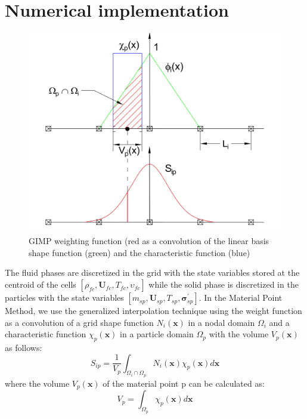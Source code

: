 \documentclass[preprint,12pt]{elsarticle}
\begin{document}
\section{\textsf{Numerical implementation}}
\label{Discretization}
%
%
\begin{figure}[H]
\center
\includegraphics[scale=.5]{GIMPshape.jpg}
\caption{GIMP weighting function (red as a convolution of the linear basis shape function (green) and the characteristic function (blue)}
\label{fig:GIMP}
\end {figure}
%
The fluid phases are discretized in the grid with the state variables stored at the centroid of the cells $[\rho_{fc},\pmb{U}_{fc},T_{fc},\upsilon_{fc}]$ while the solid phase is discretized in the particles with the state variables $[m_{sp},\pmb{U}_{sp},T_{sp},\pmb{\sigma}^\prime_{sp}]$. In the Material Point Method, we use the generalized interpolation technique \cite{GIMP} using the weight function as a convolution of a grid shape function $N_i(\pmb{x})$ in a nodal domain $\Omega_i$ and a characteristic function $\chi_p (\pmb{x})$ in a particle domain $\Omega_p$ with the volume $V_p (\pmb{x})$ as follows:
%
%
\begin{equation}
     S_{ip} = \frac {1}{V_p} \int_{\Omega_i \cap \Omega_p} N_i(\pmb{x}) \chi_p (\pmb{x}) d\pmb{x}
\end {equation}
%
%
where the volume $V_p (\pmb{x})$ of the material point p can be calculated as:
%
%
\begin{equation}
     V_{p} = \int_{\Omega_p} \chi_p (\pmb{x}) d\pmb{x}
\end {equation}
\end{document}
